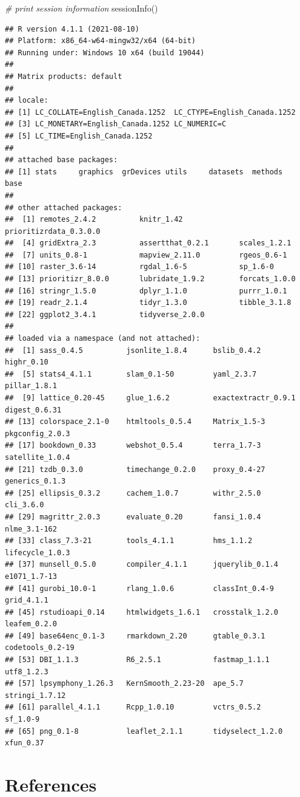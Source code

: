 \documentclass[
  12pt,
]{book}
\newenvironment{Shaded}{\begin{snugshade}}{\end{snugshade}}
\newcommand{\CommentTok}[1]{\textcolor[rgb]{0.56,0.35,0.01}{\textit{#1}}}
\newcommand{\FunctionTok}[1]{\textcolor[rgb]{0.00,0.00,0.00}{#1}}
\newcommand{\NormalTok}[1]{#1}
\begin{document}
\begin{Shaded}
\begin{Highlighting}[]
\CommentTok{\# print session information}
\FunctionTok{sessionInfo}\NormalTok{()}
\end{Highlighting}
\end{Shaded}

\begin{verbatim}
## R version 4.1.1 (2021-08-10)
## Platform: x86_64-w64-mingw32/x64 (64-bit)
## Running under: Windows 10 x64 (build 19044)
## 
## Matrix products: default
## 
## locale:
## [1] LC_COLLATE=English_Canada.1252  LC_CTYPE=English_Canada.1252   
## [3] LC_MONETARY=English_Canada.1252 LC_NUMERIC=C                   
## [5] LC_TIME=English_Canada.1252    
## 
## attached base packages:
## [1] stats     graphics  grDevices utils     datasets  methods   base     
## 
## other attached packages:
##  [1] remotes_2.4.2          knitr_1.42             prioritizrdata_0.3.0.0
##  [4] gridExtra_2.3          assertthat_0.2.1       scales_1.2.1          
##  [7] units_0.8-1            mapview_2.11.0         rgeos_0.6-1           
## [10] raster_3.6-14          rgdal_1.6-5            sp_1.6-0              
## [13] prioritizr_8.0.0       lubridate_1.9.2        forcats_1.0.0         
## [16] stringr_1.5.0          dplyr_1.1.0            purrr_1.0.1           
## [19] readr_2.1.4            tidyr_1.3.0            tibble_3.1.8          
## [22] ggplot2_3.4.1          tidyverse_2.0.0       
## 
## loaded via a namespace (and not attached):
##  [1] sass_0.4.5          jsonlite_1.8.4      bslib_0.4.2         highr_0.10         
##  [5] stats4_4.1.1        slam_0.1-50         yaml_2.3.7          pillar_1.8.1       
##  [9] lattice_0.20-45     glue_1.6.2          exactextractr_0.9.1 digest_0.6.31      
## [13] colorspace_2.1-0    htmltools_0.5.4     Matrix_1.5-3        pkgconfig_2.0.3    
## [17] bookdown_0.33       webshot_0.5.4       terra_1.7-3         satellite_1.0.4    
## [21] tzdb_0.3.0          timechange_0.2.0    proxy_0.4-27        generics_0.1.3     
## [25] ellipsis_0.3.2      cachem_1.0.7        withr_2.5.0         cli_3.6.0          
## [29] magrittr_2.0.3      evaluate_0.20       fansi_1.0.4         nlme_3.1-162       
## [33] class_7.3-21        tools_4.1.1         hms_1.1.2           lifecycle_1.0.3    
## [37] munsell_0.5.0       compiler_4.1.1      jquerylib_0.1.4     e1071_1.7-13       
## [41] gurobi_10.0-1       rlang_1.0.6         classInt_0.4-9      grid_4.1.1         
## [45] rstudioapi_0.14     htmlwidgets_1.6.1   crosstalk_1.2.0     leafem_0.2.0       
## [49] base64enc_0.1-3     rmarkdown_2.20      gtable_0.3.1        codetools_0.2-19   
## [53] DBI_1.1.3           R6_2.5.1            fastmap_1.1.1       utf8_1.2.3         
## [57] lpsymphony_1.26.3   KernSmooth_2.23-20  ape_5.7             stringi_1.7.12     
## [61] parallel_4.1.1      Rcpp_1.0.10         vctrs_0.5.2         sf_1.0-9           
## [65] png_0.1-8           leaflet_2.1.1       tidyselect_1.2.0    xfun_0.37
\end{verbatim}

\hypertarget{references}{%
\chapter{References}\label{references}}

  
\end{document}
